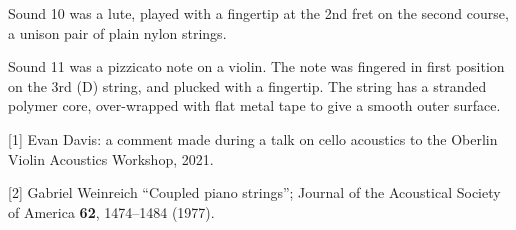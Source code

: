   Sound 10 was a lute, played with a fingertip at the 2nd fret on the second 
  course, a unison pair of plain nylon strings. 

  Sound 11 was a pizzicato note on a violin. The note was fingered in first 
  position on the 3rd (D) string, and plucked with a fingertip. The string has 
  a stranded polymer core, over-wrapped with flat metal tape to give a smooth 
  outer surface. 



  \sectionreferences{}[1] Evan Davis: a comment made during a talk on cello 
  acoustics to the Oberlin Violin Acoustics Workshop, 2021. 

  [2] Gabriel Weinreich ``Coupled piano strings''; Journal of the Acoustical 
  Society of America \textbf{62}, 1474--1484 (1977). 